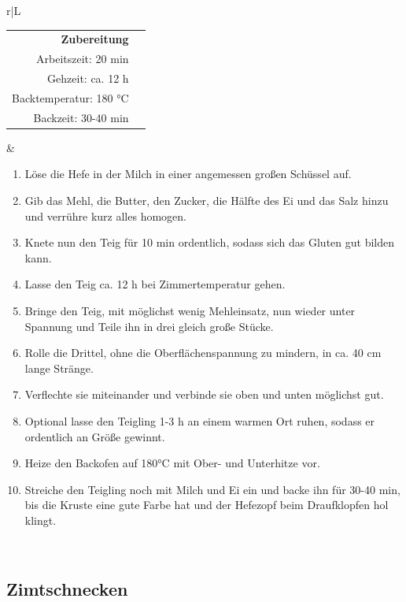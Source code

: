 \documentclass[a4paper, 12pt]{scrbook} 								%
\numberwithin{equation}{section} 									%
\begin{document}
		\begin{tabularx}{\textwidth}{r|L}
			\begin{tabular}[t]{rr}
				\textbf{Zubereitung}	\\
				Arbeitszeit: 20 min	\\
				Gehzeit: ca. 12 h \\
				Backtemperatur: 180 °C \\
				Backzeit: 30-40 min \\
			\end{tabular}			&	\begin{enumerate}[nosep]
											\item Löse die Hefe in der Milch in einer angemessen großen Schüssel auf.
											\item Gib das Mehl, die Butter, den Zucker, die Hälfte des Ei und das Salz hinzu und verrühre kurz alles homogen.
											\item Knete nun den Teig für 10 min ordentlich, sodass sich das Gluten gut bilden kann.
											\item Lasse den Teig ca. 12 h bei Zimmertemperatur gehen.
											\item Bringe den Teig, mit möglichst wenig Mehleinsatz, nun wieder unter Spannung und Teile ihn in drei gleich große Stücke.
											\item Rolle die Drittel, ohne die Oberflächenspannung zu mindern, in ca. 40 cm lange Stränge.
											\item Verflechte sie miteinander und verbinde sie oben und unten möglichst gut.
											\item Optional lasse den Teigling 1-3 h an einem warmen Ort ruhen, sodass er ordentlich an Größe gewinnt.
											\item Heize den Backofen auf 180°C mit Ober- und Unterhitze vor.
											\item Streiche den Teigling noch mit Milch und Ei ein und backe ihn für 30-40 min, bis die Kruste eine gute Farbe hat und der Hefezopf beim Draufklopfen hol klingt.
										\end{enumerate}	\\
		\end{tabularx}
		\newpage


		\subsection{Zimtschnecken}	\label{zimtschnecken}
\end{document}
